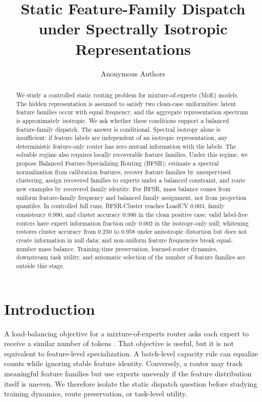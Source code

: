 \documentclass{article}
\title{Static Feature-Family Dispatch under Spectrally Isotropic Representations}
\author{Anonymous Authors}
\begin{document}
\maketitle

\begin{abstract}
We study a controlled static routing problem for mixture-of-experts (MoE)
models.  The hidden representation is assumed to satisfy two clean-case
uniformities: latent feature families occur with equal frequency, and the
aggregate representation spectrum is approximately isotropic.  We ask whether
these conditions support a balanced feature-family dispatch.  The answer is
conditional.  Spectral isotropy alone is insufficient: if feature labels are
independent of an isotropic representation, any deterministic feature-only router
has zero mutual information with the labels.  The solvable regime also requires
locally recoverable feature families.  Under this regime, we propose Balanced
Feature-Specializing Routing (BFSR): estimate a spectral normalization from
calibration features, recover feature families by unsupervised clustering, assign
recovered families to experts under a balanced constraint, and route new examples
by recovered family identity.  For BFSR, mass balance comes from uniform
feature-family frequency and balanced family assignment, not from projection
quantiles.  In controlled full runs, BFSR-Cluster reaches LoadCV 0.003, family
consistency 0.990, and cluster accuracy 0.986 in the clean positive case; valid
label-free routers have expert information fraction only 0.002 in the
isotropy-only null; whitening restores cluster accuracy from 0.250 to 0.958 under
anisotropic distortion but does not create information in null data; and
non-uniform feature frequencies break equal-number mass balance.  Training-time
preservation, learned-router dynamics, downstream task utility, and automatic
selection of the number of feature families are outside this stage.
\end{abstract}

\section{Introduction}

A load-balancing objective for a mixture-of-experts router asks each expert to
receive a similar number of tokens \citep{shazeer2017outrageously,
fedus2022switch}.  That objective is useful, but it is not equivalent to
feature-level specialization.  A batch-level capacity rule can equalize counts
while ignoring stable feature identity.  Conversely, a router may track
meaningful feature families but use experts unevenly if the feature distribution
itself is uneven.  We therefore isolate the static dispatch question before
studying training dynamics, route preservation, or task-level utility.
\end{document}
